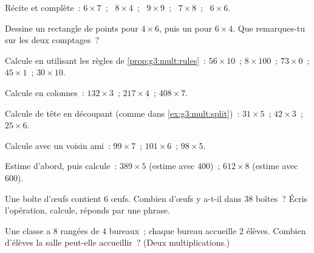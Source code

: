 \begin{exercise}[$\star$]\label{exo:g3:mult:2}
Récite et complète~: $6 \times 7$~; \ $8 \times 4$~; \
$9 \times 9$~; \ $7 \times 8$~; \ $6 \times 6$.
\end{exercise}

\begin{exercise}[$\star$]\label{exo:g3:mult:3}
Dessine un rectangle de points pour $4 \times 6$, puis un pour
$6 \times 4$. Que remarques-tu sur les deux comptages~?
\end{exercise}

\begin{exercise}[$\star$]\label{exo:g3:mult:4}
Calcule en utilisant les règles de \cref{prop:g3:mult:rules}~:
$56 \times 10$~; \quad $8 \times 100$~; \quad $73 \times 0$~; \quad
$45 \times 1$~; \quad $30 \times 10$.
\end{exercise}

\begin{exercise}[$\star$]\label{exo:g3:mult:5}
Calcule en colonnes~: $132 \times 3$~; \quad $217 \times 4$~; \quad
$408 \times 7$.
\end{exercise}

\begin{exercise}[$\star$]\label{exo:g3:mult:6}
Calcule de tête en découpant (comme dans
\cref{ex:g3:mult:split})~: $31 \times 5$~; \quad $42 \times 3$~;
\quad $25 \times 6$.
\end{exercise}

\begin{exercise}[$\star$]\label{exo:g3:mult:7}
Calcule avec un voisin ami~: $99 \times 7$~; \quad
$101 \times 6$~; \quad $98 \times 5$.
\end{exercise}

\begin{exercise}[$\star$]\label{exo:g3:mult:8}
Estime d'abord, puis calcule~: $389 \times 5$ (estime avec $400$)~;
$612 \times 8$ (estime avec $600$).
\end{exercise}

\begin{exercise}[$\star$]\label{exo:g3:mult:9}
Une boîte d'œufs contient $6$ œufs. Combien d'œufs y
a-t-il dans $38$ boîtes~? Écris l'opération, calcule, réponds
par une phrase.
\end{exercise}

\begin{exercise}[$\star\star$]\label{exo:g3:mult:10}
Une classe a $8$ rangées de $4$ bureaux~; chaque bureau accueille
$2$ élèves. Combien d'élèves la salle peut-elle accueillir~?
(Deux multiplications.)
\end{exercise}

